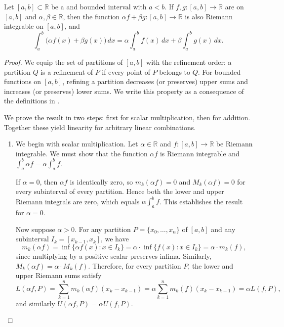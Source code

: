 \begin{theorem} \label{theorem:linearity_of_riemann_integral}
    Let $[a,b] \subset \mathbb{R}$ be a  and bounded interval with $a < b$. If $f,g : [a,b] \to \mathbb{R}$ are  on $[a,b]$ and $\alpha,\beta \in \mathbb{R}$, then the function $\alpha f + \beta g : [a,b] \to \mathbb{R}$ is also Riemann integrable on $[a,b]$, and
    $$\int_a^b \bigl(\alpha f(x) + \beta g(x)\bigr)\,dx = \alpha \int_a^b f(x)\,dx + \beta \int_a^b g(x)\,dx.$$
\end{theorem}

\begin{proof}
We equip the set of partitions of $[a,b]$ with the refinement order: a partition $Q$ is a refinement of $P$ if every point of $P$ belongs to $Q$. For bounded functions on $[a,b]$, refining a partition decreases (or preserves) upper sums and increases (or preserves) lower sums. We write this property as a consequence of the definitions in .

We prove the result in two steps: first for scalar multiplication, then for addition. Together these yield linearity for arbitrary linear combinations.

\begin{enumerate}
    \item We begin with scalar multiplication. Let $\alpha \in \mathbb{R}$ and $f : [a,b] \to \mathbb{R}$ be Riemann integrable. We must show that the function $\alpha f$ is Riemann integrable and $\int_a^b \alpha f = \alpha \int_a^b f$.

    If $\alpha = 0$, then $\alpha f$ is identically zero, so $m_k(\alpha f) = 0$ and $M_k(\alpha f) = 0$ for every subinterval of every partition. Hence both the lower and upper Riemann integrals are zero, which equals $\alpha \int_a^b f$. This establishes the result for $\alpha = 0$.

    Now suppose $\alpha > 0$. For any partition $P = \{x_0,\dots,x_n\}$ of $[a,b]$ and any subinterval $I_k = [x_{k-1}, x_k]$, we have
    $$m_k(\alpha f) = \inf\{\alpha f(x) : x \in I_k\} = \alpha \cdot \inf\{f(x) : x \in I_k\} = \alpha \cdot m_k(f),$$
    since multiplying by a positive scalar preserves infima. Similarly, $M_k(\alpha f) = \alpha \cdot M_k(f)$. Therefore, for every partition $P$, the lower and upper Riemann sums satisfy $$L(\alpha f,P) = \sum_{k=1}^n m_k(\alpha f)(x_k - x_{k-1}) = \alpha \sum_{k=1}^n m_k(f)(x_k - x_{k-1}) = \alpha L(f,P),$$ and similarly $U(\alpha f,P) = \alpha U(f,P)$.


\end{enumerate}
\end{proof}
